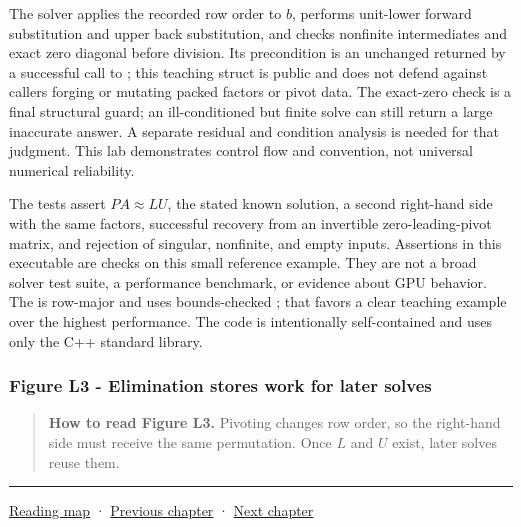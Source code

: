 The solver applies the recorded row order to \(b\), performs unit-lower forward substitution and upper back substitution, and checks nonfinite intermediates and exact zero diagonal before division. Its precondition is an unchanged  returned by a successful call to ; this teaching struct is public and does not defend against callers forging or mutating packed factors or pivot data. The exact-zero check is a final structural guard; an ill-conditioned but finite solve can still return a large inaccurate answer. A separate residual and condition analysis is needed for that judgment. This lab demonstrates control flow and convention, not universal numerical reliability.

The tests assert \(PA\approx LU\), the stated known solution, a second right-hand side with the same factors, successful recovery from an invertible zero-leading-pivot matrix, and rejection of singular, nonfinite, and empty inputs. Assertions in this executable are checks on this small reference example. They are not a broad solver test suite, a performance benchmark, or evidence about GPU behavior. The  is row-major and uses bounds-checked ; that favors a clear teaching example over the highest performance. The code is intentionally self-contained and uses only the C++ standard library.

\subsubsection{Figure L3 - Elimination stores work for later solves}\label{01-foundations-i-ch019-figure-l3---elimination-stores-work-for-later-solves}

\hypertarget{01-foundations-i-ch019-figure-l3---elimination-stores-work-for-later-solves}{}


\begin{quote}
\textbf{How to read Figure L3.} Pivoting changes row order, so the right-hand side must receive the same permutation. Once \(L\) and \(U\) exist, later solves reuse them.
\end{quote}

\begin{center}\rule{0.5\linewidth}{0.5pt}\end{center}

\hyperref[volume-reading-map]{Reading map} · \hyperref[01-foundations-i-ch018-vectors-for-light-and-frames]{Previous chapter} · \hyperref[01-foundations-i-ch020-choose-matrix-factorizations-from-structure]{Next chapter}
